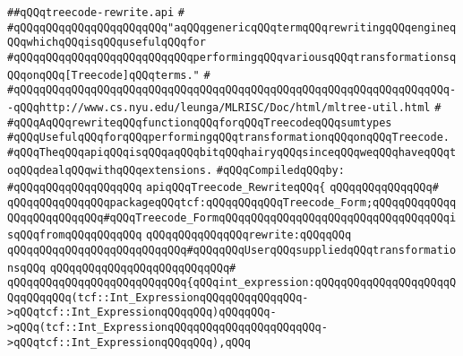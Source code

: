 \label{src/lib/compiler/back/low/treecode/treecode-rewrite.api}
\verb|##qQQqtreecode-rewrite.api|\newline
\verb|#|\newline
\verb|#qQQqqQQqqQQqqQQqqQQqqQQq"aqQQqgenericqQQqtermqQQqrewritingqQQqengineqQQqwhichqQQqisqQQqusefulqQQqfor|\newline
\verb|#qQQqqQQqqQQqqQQqqQQqqQQqqQQqperformingqQQqvariousqQQqtransformationsqQQqonqQQq[Treecode]qQQqterms."|\newline
\verb|#|\newline
\verb|#qQQqqQQqqQQqqQQqqQQqqQQqqQQqqQQqqQQqqQQqqQQqqQQqqQQqqQQqqQQqqQQqqQQq--qQQqhttp://www.cs.nyu.edu/leunga/MLRISC/Doc/html/mltree-util.html|\newline
\verb|#|\newline
\verb|#qQQqAqQQqrewriteqQQqfunctionqQQqforqQQqTreecodeqQQqsumtypes|\newline
\verb|#qQQqUsefulqQQqforqQQqperformingqQQqtransformationqQQqonqQQqTreecode.|\newline
\verb|#qQQqTheqQQqapiqQQqisqQQqaqQQqbitqQQqhairyqQQqsinceqQQqweqQQqhaveqQQqtoqQQqdealqQQqwithqQQqextensions.|\newline
\newline
\verb|#qQQqCompiledqQQqby:|\newline
\verb|#qQQqqQQqqQQqqQQqqQQq|\newline
\newline
\verb|apiqQQqTreecode_RewriteqQQq{|\newline
\verb|qQQqqQQqqQQqqQQq#|\newline
\verb|qQQqqQQqqQQqqQQqpackageqQQqtcf:qQQqqQQqqQQqTreecode_Form;qQQqqQQqqQQqqQQqqQQqqQQqqQQq#qQQqTreecode_FormqQQqqQQqqQQqqQQqqQQqqQQqqQQqqQQqqQQqisqQQqfromqQQqqQQqqQQq|\newline
\newline
\verb|qQQqqQQqqQQqqQQqrewrite:qQQqqQQq|\newline
\verb|qQQqqQQqqQQqqQQqqQQqqQQqqQQq#qQQqqQQqUserqQQqsuppliedqQQqtransformationsqQQq|\newline
\verb|qQQqqQQqqQQqqQQqqQQqqQQqqQQq#|\newline
\verb|qQQqqQQqqQQqqQQqqQQqqQQqqQQq{qQQqint_expression:qQQqqQQqqQQqqQQqqQQqqQQqqQQqqQQq(tcf::Int_ExpressionqQQqqQQqqQQqqQQq->qQQqtcf::Int_ExpressionqQQqqQQq)qQQqqQQq->qQQq(tcf::Int_ExpressionqQQqqQQqqQQqqQQqqQQqqQQq->qQQqtcf::Int_ExpressionqQQqqQQq),qQQq|\newline
